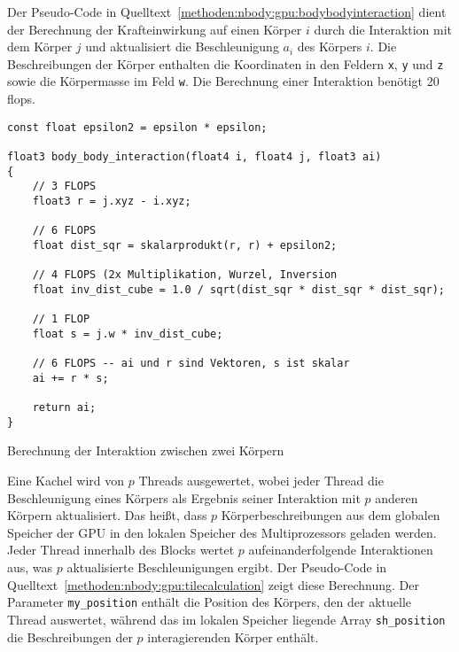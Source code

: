 Der Pseudo-Code in Quelltext~\ref{methoden:nbody:gpu:bodybodyinteraction}
dient der Berechnung der Krafteinwirkung auf einen Körper $i$ durch die
Interaktion mit dem Körper $j$ und aktualisiert die Beschleunigung $a_i$ des
Körpers $i$. Die Beschreibungen der Körper enthalten die Koordinaten in den
Feldern \texttt{x}, \texttt{y} und \texttt{z} sowie die Körpermasse im Feld
\texttt{w}. Die Berechnung einer Interaktion benötigt 20 \gls{flops}.

\begin{code}
    \begin{verbatim}
const float epsilon2 = epsilon * epsilon;

float3 body_body_interaction(float4 i, float4 j, float3 ai)
{
    // 3 FLOPS
    float3 r = j.xyz - i.xyz;

    // 6 FLOPS
    float dist_sqr = skalarprodukt(r, r) + epsilon2;

    // 4 FLOPS (2x Multiplikation, Wurzel, Inversion 
    float inv_dist_cube = 1.0 / sqrt(dist_sqr * dist_sqr * dist_sqr);

    // 1 FLOP
    float s = j.w * inv_dist_cube;

    // 6 FLOPS -- ai und r sind Vektoren, s ist skalar
    ai += r * s;

    return ai;
}
    \end{verbatim}
    \caption{Berechnung der Interaktion zwischen zwei Körpern}
    \label{methoden:nbody:gpu:bodybodyinteraction}
\end{code}

Eine Kachel wird von $p$ Threads ausgewertet, wobei jeder Thread die
Beschleunigung eines Körpers als Ergebnis seiner Interaktion mit $p$ anderen
Körpern aktualisiert. Das heißt, dass $p$ Körperbeschreibungen aus dem globalen
Speicher der GPU in den lokalen Speicher des Multiprozessors geladen werden.
Jeder Thread innerhalb des Blocks wertet $p$ aufeinanderfolgende Interaktionen
aus, was $p$ aktualisierte Beschleunigungen ergibt. Der Pseudo-Code in
Quelltext~\ref{methoden:nbody:gpu:tilecalculation} zeigt diese Berechnung. Der
Parameter \texttt{my\_position} enthält die Position des Körpers, den der
aktuelle Thread auswertet, während das im lokalen Speicher liegende Array
\texttt{sh\_position} die Beschreibungen der $p$ interagierenden Körper enthält.


